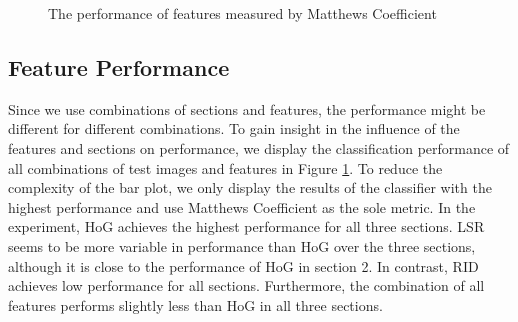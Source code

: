 \datazero

\begin{figure}[]
	\caption{The performance of features measured by Matthews Coefficient}
	\label{fig:res_bar_0}
\end{figure}

\subsection{Feature Performance}

Since we use combinations of sections and features, the performance might be different for different combinations. To gain insight in the influence of the features and sections on performance, we display the classification performance of all combinations of test images and features in Figure \ref{fig:res_bar_0}. To reduce the complexity of the bar plot, we only display the results of the classifier with the highest performance and use Matthews Coefficient as the sole metric. In the experiment, HoG achieves the highest performance for all three sections. LSR seems to be more variable in performance than HoG over the three sections, although it is close to the performance of HoG in section 2. In contrast, RID achieves low performance for all sections. Furthermore, the combination of all features performs slightly less than HoG in all three sections.


\dataone

